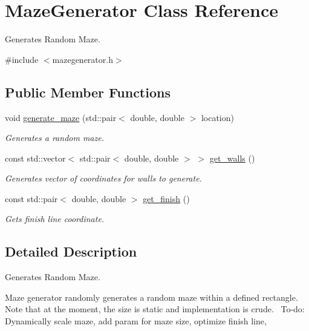 \hypertarget{classMazeGenerator}{}\section{Maze\+Generator Class Reference}
\label{classMazeGenerator}


Generates Random Maze.  




{\ttfamily \#include $<$mazegenerator.\+h$>$}

\subsection*{Public Member Functions}
\begin{DoxyCompactItemize}
\item 
void \hyperlink{classMazeGenerator_a67dbf663cdcc539fdb7583e8adcd58dc}{generate\+\_\+maze} (std\+::pair$<$ double, double $>$ location)
\begin{DoxyCompactList}\small\item\em Generates a random maze. \end{DoxyCompactList}\item 
const std\+::vector$<$ std\+::pair$<$ double, double $>$ $>$ \hyperlink{classMazeGenerator_ad3273f40be7ddb219fb419a8c0d707c3}{get\+\_\+walls} ()
\begin{DoxyCompactList}\small\item\em Generates vector of coordinates for walls to generate. \end{DoxyCompactList}\item 
const std\+::pair$<$ double, double $>$ \hyperlink{classMazeGenerator_a98a262b1588845a44c47ff59f9f3dccd}{get\+\_\+finish} ()
\begin{DoxyCompactList}\small\item\em Gets finish line coordinate. \end{DoxyCompactList}\end{DoxyCompactItemize}


\subsection{Detailed Description}
Generates Random Maze. 

Maze generator randomly generates a random maze within a defined rectangle.~\newline
Note that at the moment, the size is static and implementation is crude.~\newline
To-\/do\+: Dynamically scale maze, add param for maze size, optimize finish line, 


